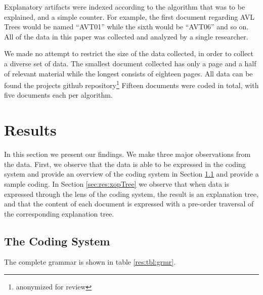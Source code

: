 \documentclass[sigconf]{acmart}
\begin{document}
Explanatory artifacts were indexed according to the algorithm that was to be
explained, and a simple counter. For example, the first document regarding AVL
Trees would be named ``AVT01'' while the sixth would be ``AVT06'' and so on.
All of the data in this paper was collected and analyzed by a single researcher.

We made no attempt to restrict the size of the data collected, in order to
collect a diverse set of data. The smallest document collected has only a page
and a half of relevant material while the longest consists of eighteen pages.
All data can be found the projects github repository\footnote[1]{anonymized for
  review} Fifteen documents were coded in total, with five documents each per
algorithm.

\section{Results}
In this section we present our findings. We make three major observations from
the data. First, we observe that the data is able to be expressed in the coding
system and provide an overview of the coding system in Section \ref{sec:res:sys}
and provide a sample coding. In Section \ref{sec:res:xopTree} we observe that
when data is expressed through the lens of the coding system, the result is an
explanation tree, and that the content of each document is expressed with a
pre-order traversal of the corresponding explanation tree.

\subsection{The Coding System}
\label{sec:res:sys}

The complete grammar is shown in table \ref{res:tbl:grmr}.




\end{document}
